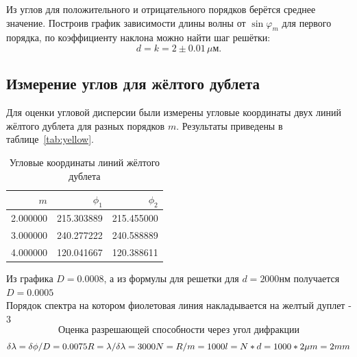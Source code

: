\documentclass[a4paper, 12pt]{article}
\begin{document}
Из углов для положительного и отрицательного порядков берётся среднее значение. Построив график зависимости длины волны от \(\sin \varphi_m\) для первого порядка, по коэффициенту наклона можно найти шаг решётки:
\[
d = k = 2  \pm 0.01\,\mu\text{м}.
\]

\subsection{Измерение углов для жёлтого дублета}

Для оценки угловой дисперсии были измерены угловые координаты двух линий жёлтого дублета для разных порядков \(m\). Результаты приведены в таблице~\ref{tab:yellow}.



\begin{table}[H]
\centering
\caption{Угловые координаты линий жёлтого дублета}
\begin{tabular}{rrr}
    \toprule
    $m$ & $\phi_1$ & $\phi_2$ \\
    \midrule
    2.000000 & 215.303889 & 215.455000 \\
    3.000000 & 240.277222 & 240.588889 \\
    4.000000 & 120.041667 & 120.388611 \\
    \bottomrule
\end{tabular}
\label{tab:yellow2}
\end{table}

Из графика $D = 0.0008$, а из формулы для решетки для $d = 2000нм$ получается $D = 0.0005$
\\
Порядок спектра на котором фиолетовая линия накладывается на желтый дуплет - 3
\\


\[
\textbf{Оценка разрешающей способности через угол дифракции}
\]
\[
\delta \lambda = \delta \phi / D = 0.0075 \\
R = \lambda/\delta \lambda = 3000 \\
N = R/m = 1000 \\
l = N*d = 1000*2\mu m = 2 mm 
\]

	
\end{document}
